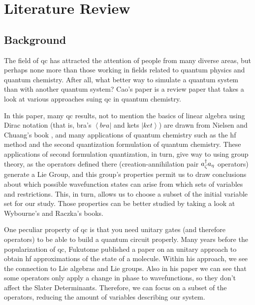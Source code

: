 \documentclass{aux/ttuthes2007}
\newcommand{\bra}[1]{\ensuremath{\left\langle#1\right\vert}}
\newcommand{\ket}[1]{\ensuremath{\left|#1\right\rangle}}
\newcommand{\anig}[1]{a_{\go{#1}}}
\newcommand{\creg}[1]{a^\dagger_{\go{#1}}}
\newcommand{\go}[1]{
		\IfEqCase{#1}{
			{0}{\zeta}
			{1}{\eta}
			{2}{\iota}
			{3}{\kappa}
		}[\PackageError{unocorb}{Undefined option to go: #1}{}]
}
\begin{document}
\chapter{\textbf{Literature Review}}\label{chap:literature}

\section{\textbf{Background}}
The field of \gls{qc} has attracted the attention of people from many diverse areas, but perhaps none more than those working in fields related to quantum physics and quantum chemistry. After all, what better way to simulate a quantum system than with another quantum system? Cao's paper  is a review paper that takes a look at various approaches suing \gls{qc} in quantum chemistry.

	In this paper, many \gls{qc} results, not to mention the basics of linear algebra using Dirac notation (that is, bra's $\bra {bra}$ and kets $\ket{ket}$) are drawn from Nielsen and Chuang's book \cite{nielsen}, and many applications of quantum chemistry such as the \gls{hf} method and the second quantization formulation of quantum chemistry.
	These applications of second formulation quantization, in turn, give way to using group theory, as the operators defined there (creation-annihilation pair $\creg 0\anig 1$ operators) generate a Lie Group, and this group's properties permit us to draw conclusions about which possible wavefunction states can arise from which sets of variables and restrictions. This, in turn, allows us to choose a subset of the initial variable set for our study. Those properties can be better studied by taking a look at Wybourne's  and Raczka's  books.
	
	One peculiar property of \gls{qc} is that you need unitary gates (and therefore operators) to be able to build a quantum circuit properly. Many years before the popularization of \gls{qc}, Fukutome  published a paper on an unitary approach to obtain \gls{hf} approximations of the state of a molecule. Within his approach, we see the connection to Lie algebras and Lie groups. Also in his paper we can see that some operators only apply a change in phase to wavefunctions, so they don't affect the Slater Determinants. Therefore, we can focus on a subset of the operators, reducing the amount of variables describing our system.
\end{document}
